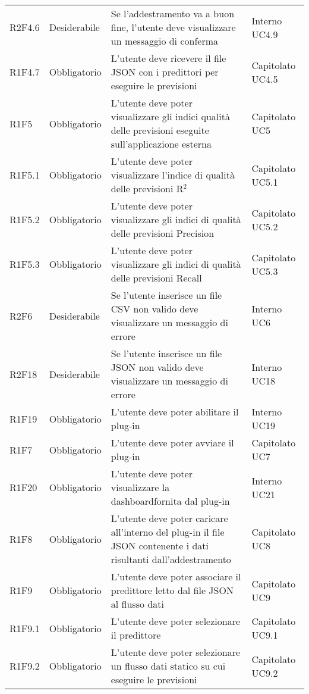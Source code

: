 \begin{longtable} {
		>{}p{24mm} 
		>{}p{32mm}
		>{}p{40mm} 
		>{}p{24.5mm}
		}
		R2F4.6 & Desiderabile & Se l'addestramento va a buon fine, l'utente deve visualizzare un messaggio di conferma & Interno UC4.9 \TBstrut \\ [2mm]		
		R1F4.7 & Obbligatorio & L'utente deve ricevere il file JSON con i predittori per eseguire le previsioni & Capitolato UC4.5 \TBstrut \\ [2mm]
		R1F5 & Obbligatorio & L'utente deve poter visualizzare gli indici qualità delle previsioni eseguite sull'applicazione esterna & Capitolato UC5 \TBstrut \\ [2mm]
		R1F5.1 & Obbligatorio & L'utente deve poter visualizzare l'indice di qualità delle previsioni R$^{2}$\glo & Capitolato UC5.1 \TBstrut \\ [2mm]
		R1F5.2 & Obbligatorio & L'utente deve poter visualizzare gli indici di qualità delle previsioni Precision & Capitolato UC5.2 \TBstrut \\ [2mm]
		R1F5.3 & Obbligatorio & L'utente deve poter visualizzare gli indici di qualità delle previsioni Recall & Capitolato UC5.3 \TBstrut \\ [2mm]
		R2F6 & Desiderabile & Se l'utente inserisce un file CSV non valido deve visualizzare un messaggio di errore & Interno UC6 \TBstrut \\ [2mm]
		R2F18 & Desiderabile & Se l'utente inserisce un file JSON non valido deve visualizzare un messaggio di errore & Interno UC18 \TBstrut \\ [2mm]
		R1F19 & Obbligatorio & L'utente deve poter abilitare il plug-in & Interno UC19 \TBstrut \\ [2mm]
		R1F7 & Obbligatorio & L'utente deve poter avviare il plug-in & Capitolato UC7 \TBstrut \\ [2mm]
		R1F20 & Obbligatorio & L'utente deve poter visualizzare la dashboard\glosp fornita dal plug-in & Interno UC21 \TBstrut \\ [2mm]
		R1F8 & Obbligatorio & L'utente deve poter caricare all'interno del plug-in il file JSON contenente i dati risultanti dall'addestramento & Capitolato UC8 \TBstrut \\ [2mm]
		R1F9 & Obbligatorio & L'utente deve poter associare il predittore letto dal file JSON al flusso dati & Capitolato UC9 \TBstrut \\ [2mm]
		R1F9.1 & Obbligatorio & L'utente deve poter selezionare il predittore & Capitolato UC9.1 \TBstrut \\ [2mm]
		R1F9.2 & Obbligatorio & L'utente deve poter selezionare un flusso dati statico su cui eseguire le previsioni & Capitolato UC9.2 \TBstrut \\ [2mm]

\end{longtable}

